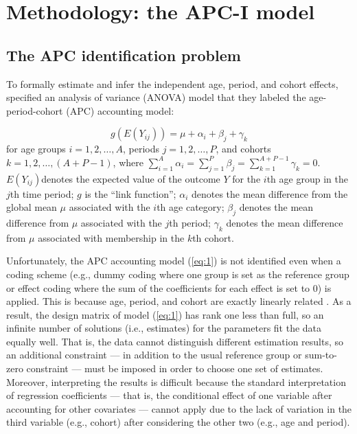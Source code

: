 \section{Methodology: the APC-I model} \label{methodology}
\subsection{The APC identification problem} \label{identification}

To formally estimate and infer the independent age, period, and cohort effects, \citet{mason_methodological_1973} specified an analysis of variance (ANOVA) model that they labeled the age-period-cohort (APC) accounting model:

\begin{equation} \label{eq:1}
g\left(E\left(Y_{i j}\right)\right)=\mu+\alpha_{i}+\beta_{j}+\gamma_{k}
\end{equation}
for age groups $i=1, 2,\ldots, A$, periods $j=1, 2,\ldots, P$, and cohorts $k=1, 2,\ldots, (A+P-1)$, where $\sum_{i=1}^{A} \alpha_{i}=\sum_{j=1}^{P}\beta_{j}=\sum_{k=1}^{A+P-1} \gamma_{k}=0$. $E\left(Y_{i j}\right)$denotes the expected value of the outcome $Y$ for the $i$th age group in the $j$th time period; $g$ is the ``link function''; $\alpha_i$ denotes the mean difference from the global mean $\mu$ associated with the $i$th age category; $\beta_j$ denotes the mean difference from $\mu$ associated with the $j$th period; $\gamma_k$ denotes the mean difference from $\mu$ associated with membership in the $k$th cohort.  

Unfortunately, the APC accounting model (\ref{eq:1}) is not identified even when a coding scheme (e.g., dummy coding where one group is set as the reference group or effect coding where the sum of the coefficients for each effect is set to 0) is applied. This is because age, period, and cohort are exactly linearly related \citep[see][for detailed discussions]{fienberg_identification_1979,fosse_analyzing_2019,luo_sensitivity_2016}. As a result, the design matrix of model (\ref{eq:1}) has rank one less than full, so an infinite number of solutions (i.e., estimates) for the parameters fit the data equally well.  That is, the data cannot distinguish different estimation results, so an additional constraint — in addition to the usual reference group or sum-to-zero constraint — must be imposed in order to choose one set of estimates.  Moreover, interpreting the results is difficult because the standard interpretation of regression coefficients — that is, the conditional effect of one variable after accounting for other covariates — cannot apply due to the lack of variation in the third variable (e.g., cohort) after considering the other two (e.g., age and period).


